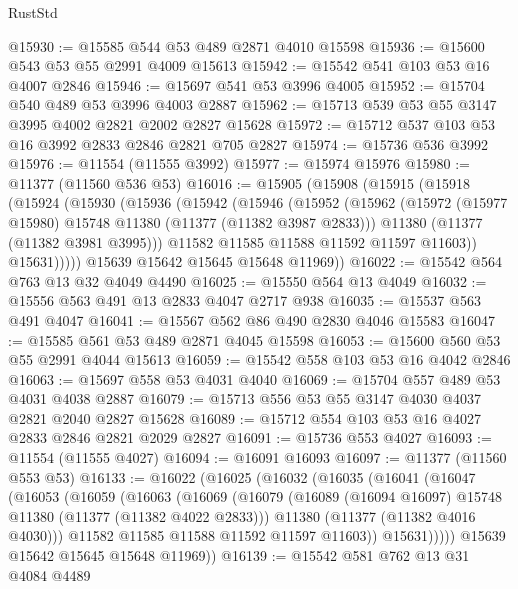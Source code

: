 \begin{lexlean}{RustStd}
\begin{coremodule}
{\begin{coremodule}
{{{{{{{{{{{{{{{{{{{{{{{{{{{{{{{{{@15930 := @15585 @544 @53 @489 @2871 @4010 @15598
@15936 := @15600 @543 @53 @55 @2991 @4009 @15613
@15942 := @15542 @541 @103 @53 @16 @4007 @2846
@15946 := @15697 @541 @53 @3996 @4005
@15952 := @15704 @540 @489 @53 @3996 @4003 @2887
@15962 := @15713 @539 @53 @55 @3147 @3995 @4002 @2821 @2002 @2827 @15628
@15972 := @15712 @537 @103 @53 @16 @3992 @2833 @2846 @2821 @705 @2827
@15974 := @15736 @536 @3992
@15976 := @11554 (@11555 @3992)
@15977 := @15974 @15976
@15980 := @11377 (@11560 @536 @53)
@16016 := @15905
    (@15908
      (@15915
        (@15918
          (@15924
            (@15930
              (@15936
                (@15942
                  (@15946
                    (@15952
                      (@15962
                        (@15972 (@15977 @15980) @15748 @11380 (@11377 (@11382 @3987 @2833)))
                        @11380
                        (@11377 (@11382 @3981 @3995)))
                      @11582
                      @11585
                      @11588
                      @11592
                      @11597
                      @11603))
                  @15631)))))
        @15639
        @15642
        @15645
        @15648
        @11969))
@16022 := @15542 @564 @763 @13 @32 @4049 @4490
@16025 := @15550 @564 @13 @4049
@16032 := @15556 @563 @491 @13 @2833 @4047 @2717 @938
@16035 := @15537 @563 @491 @4047
@16041 := @15567 @562 @86 @490 @2830 @4046 @15583
@16047 := @15585 @561 @53 @489 @2871 @4045 @15598
@16053 := @15600 @560 @53 @55 @2991 @4044 @15613
@16059 := @15542 @558 @103 @53 @16 @4042 @2846
@16063 := @15697 @558 @53 @4031 @4040
@16069 := @15704 @557 @489 @53 @4031 @4038 @2887
@16079 := @15713 @556 @53 @55 @3147 @4030 @4037 @2821 @2040 @2827 @15628
@16089 := @15712 @554 @103 @53 @16 @4027 @2833 @2846 @2821 @2029 @2827
@16091 := @15736 @553 @4027
@16093 := @11554 (@11555 @4027)
@16094 := @16091 @16093
@16097 := @11377 (@11560 @553 @53)
@16133 := @16022
    (@16025
      (@16032
        (@16035
          (@16041
            (@16047
              (@16053
                (@16059
                  (@16063
                    (@16069
                      (@16079
                        (@16089 (@16094 @16097) @15748 @11380 (@11377 (@11382 @4022 @2833)))
                        @11380
                        (@11377 (@11382 @4016 @4030)))
                      @11582
                      @11585
                      @11588
                      @11592
                      @11597
                      @11603))
                  @15631)))))
        @15639
        @15642
        @15645
        @15648
        @11969))
@16139 := @15542 @581 @762 @13 @31 @4084 @4489
}}}}}}}}}}}}}}}}}}}}}}}}}}}}}}}}}
\end{coremodule}}
\end{coremodule}
\end{lexlean}
